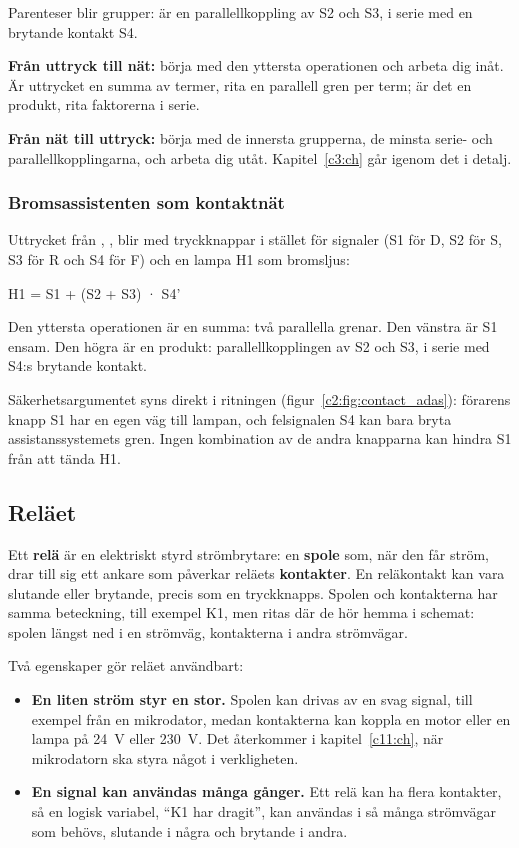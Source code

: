 \noindent Parenteser blir grupper: \mbox{} är en parallellkoppling av S2 och
S3, i serie med en brytande kontakt S4.

\textbf{Från uttryck till nät:} börja med den yttersta operationen och arbeta dig inåt. Är
uttrycket en summa av termer, rita en parallell gren per term; är det en produkt, rita faktorerna
i serie.

\textbf{Från nät till uttryck:} börja med de innersta grupperna, de minsta serie- och
parallellkopplingarna, och arbeta dig utåt. Kapitel~\ref{c3:ch} går igenom det i detalj.

\subsubsection{Bromsassistenten som kontaktnät}
Uttrycket från , \mbox{}, blir med tryckknappar i stället för
signaler (S1 för D, S2 för S, S3 för R och S4 för F) och en lampa H1 som bromsljus:

\begin{textdrawing}
H1 = S1 + (S2 + S3) · S4'
\end{textdrawing}

\noindent Den yttersta operationen är en summa: två parallella grenar. Den vänstra är S1 ensam. Den
högra är en produkt: parallellkopplingen av S2 och S3, i serie med S4:s brytande kontakt.


Säkerhetsargumentet syns direkt i ritningen (figur~\ref{c2:fig:contact_adas}): förarens knapp S1
har en egen väg till lampan, och felsignalen S4 kan bara bryta assistanssystemets gren. Ingen
kombination av de andra knapparna kan hindra S1 från att tända H1.

\subsection{Reläet}
\label{c2:b7}
Ett \textbf{relä} är en elektriskt styrd strömbrytare: en \textbf{spole} som, när den får ström,
drar till sig ett ankare som påverkar reläets \textbf{kontakter}. En reläkontakt kan vara slutande
eller brytande, precis som en tryckknapps. Spolen och kontakterna har samma beteckning, till
exempel K1, men ritas där de hör hemma i schemat: spolen längst ned i en strömväg, kontakterna i
andra strömvägar.

Två egenskaper gör reläet användbart:
\begin{itemize}
  \item \textbf{En liten ström styr en stor.} Spolen kan drivas av en svag signal, till exempel från
    en mikrodator, medan kontakterna kan koppla en motor eller en lampa på 24~V eller 230~V. Det
    återkommer i kapitel~\ref{c11:ch}, när mikrodatorn ska styra något i verkligheten.
  \item \textbf{En signal kan användas många gånger.} Ett relä kan ha flera kontakter, så en logisk
    variabel, \enquote{K1 har dragit}, kan användas i så många strömvägar som behövs, slutande i
    några och brytande i andra.
\end{itemize}

